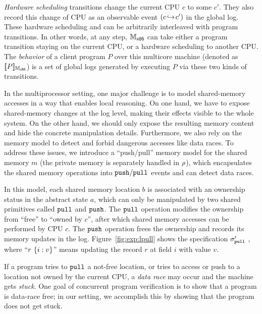 \emph{Hardware scheduling} 
transitions  change the
current CPU \allid{} $c$ to some  \allid{} $c'$. 
They also record this 
change of CPU \allid{} as an observable event $(c \switch c')$ in the global log.
These hardware scheduling
and can be arbitrarily interleaved with
program transitions.
In other words, at any step,
$\Mach_{\boot}$ can take either a program transition staying
on the current CPU,
or a hardware scheduling to another CPU.
The \emph{behavior} of a client program $P$ over this multicore machine (denoted as $\sem{\Mach_\boot}{P}$) is  a set of global logs generated by executing $P$ via these two kinds of transitions.

In the multiprocessor setting,
one major challenge is to model shared-memory accesses
in a way that enables local reasoning.
On one hand, we have to expose shared-memory changes
at the log level, making their effects visible to the whole system.
On the other hand,  we should only expose the resulting memory
content and hide the concrete manipulation details.
Furthermore, we also rely on the memory model
to detect and forbid dangerous accesses like data races.
To address these issues, we introduce
a  ``push/pull'' memory model for the shared memory $m$
(the private memory is separately handled in $\regs$),
which encapsulates the shared memory operations
into $\push/\pull$ events and can detect data races.

In this model, each shared memory location $b$ is associated
with an ownership status in the abstract state $a$, which can only be manipulated by 
two shared primitives called $\cpull$ and $\cpush$. The $\cpull$ operation modifies the ownership from ``free'' to  ``owned by $c$'', after which shared memory accesses
can be performed by CPU $c$. The $\cpush$ operation frees the ownership and records its memory updates in the log.
Figure~\ref{fig:exp:lpull} shows  the specification $\spec_\pull'$
, where ``$r\ \set{i:v}$''
means updating the record $r$ at field $i$ 
with value $v$.


If a program tries to $\pull$  a  not-free  location,
or tries to access or push to a location not owned by the current CPU,
a \emph{data race} may occur and the machine gets \emph{stuck}. 
One goal of concurrent program verification is to show
that a program is data-race free; in our setting, we accomplish 
this by showing that the program does not get stuck.

